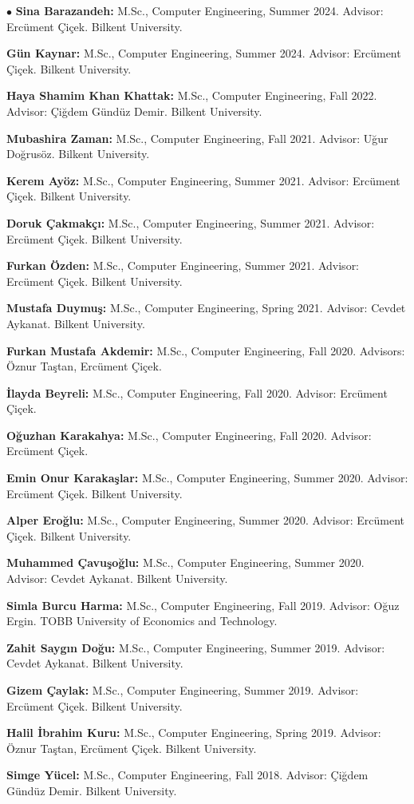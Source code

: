 \documentclass[margin,line]{res}
\newenvironment{list2}{
  \begin{list}{$\bullet$}{%
      \setlength{\itemsep}{0.1cm}
      \setlength{\parsep}{0in} \setlength{\parskip}{0in}
      \setlength{\topsep}{0in} \setlength{\partopsep}{0in} 
      \setlength{\leftmargin}{0.2in}}}{\end{list}}
\begin{document}
\begin{resume}
\begin{list2}
  {\bf Sina Barazandeh:} M.Sc., Computer Engineering, Summer 2024.
  Advisor: Ercüment Çiçek.
  Bilkent University.
\item
  {\bf Gün Kaynar:} M.Sc., Computer Engineering, Summer 2024.
  Advisor: Ercüment Çiçek.
  Bilkent University.
  \item 
  {\bf Haya Shamim Khan Khattak:} M.Sc., Computer Engineering, Fall 2022.
  Advisor: Çiğdem Gündüz Demir.
  Bilkent University.
\item
{\bf Mubashira Zaman:} M.Sc., Computer Engineering, Fall 2021.
  Advisor: Uğur Doğrusöz.
  Bilkent University.
\item
{\bf  Kerem Ayöz:} M.Sc., Computer Engineering, Summer 2021.
  Advisor: Ercüment Çiçek.
  Bilkent University.
\item
{\bf  Doruk Çakmakçı:} M.Sc., Computer Engineering, Summer 2021.
  Advisor: Ercüment Çiçek.
  Bilkent University.
\item
{\bf  Furkan Özden:} M.Sc., Computer Engineering, Summer 2021.
  Advisor: Ercüment Çiçek.
  Bilkent University.
\item
{\bf  Mustafa Duymuş:} M.Sc., Computer Engineering, Spring 2021.
  Advisor: Cevdet Aykanat.
  Bilkent University.
\item 
{\bf Furkan Mustafa Akdemir:} M.Sc., Computer Engineering, Fall 2020.
  Advisors:  Öznur Taştan, Ercüment Çiçek.
\item 
{\bf İlayda Beyreli:} M.Sc., Computer Engineering, Fall 2020.
  Advisor:  Ercüment Çiçek.
\item 
{\bf Oğuzhan Karakahya:} M.Sc., Computer Engineering, Fall 2020.
  Advisor:  Ercüment Çiçek.
\item 
{\bf  Emin Onur Karakaşlar:} M.Sc., Computer Engineering, Summer 2020.
  Advisor:  Ercüment Çiçek.
  Bilkent University.\item 
{\bf  Alper Eroğlu:} M.Sc., Computer Engineering, Summer 2020.
  Advisor:  Ercüment Çiçek.
  Bilkent University.
  \item
{\bf  Muhammed Çavuşoğlu:} M.Sc., Computer Engineering, Summer 2020.
  Advisor: Cevdet Aykanat.
  Bilkent University.
\item
{\bf  Simla Burcu Harma:} M.Sc., Computer Engineering, Fall 2019.
  Advisor: Oğuz Ergin.
  TOBB University of Economics and Technology.
\item
{\bf  Zahit Saygın Doğu:} M.Sc., Computer Engineering, Summer 2019.
  Advisor: Cevdet Aykanat.
  Bilkent University.
  \item
{\bf  Gizem Çaylak:} M.Sc., Computer Engineering, Summer 2019.
  Advisor: Ercüment Çiçek.
  Bilkent University.
\item
{\bf  Halil İbrahim Kuru:} M.Sc., Computer Engineering, Spring 2019.
  Advisor: Öznur Taştan, Ercüment Çiçek.
  Bilkent University.
\item
  {\bf Simge Yücel:} M.Sc., Computer Engineering, Fall 2018.
  Advisor: Çiğdem Gündüz Demir.
  Bilkent University.


\end{list2}
\end{resume}
\end{document}
